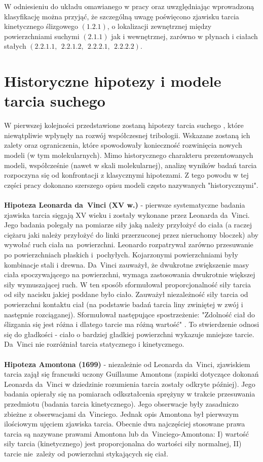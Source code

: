 \documentclass[12pt,a4paper,openright]{report} %
\begin{document}
W odniesieniu do układu omawianego w pracy oraz uwzględniając wprowadzoną klasyfikację można przyjąć, że szczególną uwagę poświęcono zjawisku tarcia kinetycznego ślizgowego $(1.2.1)$, o lokalizacji zewnętrznej między powierzchniami suchymi $(2.1.1)$ jak i wewnętrznej, zarówno w płynach i ciałach stałych $(2.2.1.1,~~ 2.2.1.2,~~ 2.2.2.1,~~ 2.2.2.2)$.
%
%
% 
\section{Historyczne hipotezy i modele tarcia suchego}
W pierwszej kolejności przedstawione zostaną hipotezy tarcia suchego \cite{Borys, Hebda, Janecki}, które niewątpliwie wpłynęły na rozwój współczesnej tribologii. Wskazane zostaną ich zalety oraz ograniczenia, które spowodowały konieczność rozwinięcia nowych modeli (w tym molekularnych). 
Mimo historycznego charakteru prezentowanych modeli, współcześnie (nawet w skali molekularnej), analizę wyników badań tarcia rozpoczyna się od konfrontacji z klasycznymi hipotezami. Z tego powodu w tej części pracy dokonano szerszego opisu modeli często nazywanych "historycznymi".  
%
\\
\\
\textbf{Hipoteza Leonarda da~Vinci (XV w.)} - pierwsze systematyczne badania zjawiska tarcia sięgają XV wieku i zostały wykonane przez Leonarda da~Vinci. Jego badania polegały na pomiarze siły jaką należy przyłożyć do ciała (a raczej ciężaru jaki należy przyłożyć do linki przerzuconej przez nieruchomy bloczek) aby wywołać ruch ciała na~powierzchni. Leonardo rozpatrywał zarówno przesuwanie po powierzchniach płaskich i~pochyłych. Kojarzonymi powierzchniami były kombinacje stali i drewna. Da~Vinci zauważył, że dwukrotne zwiększenie masy ciała spoczywającego na powierzchni, wymaga zastosowania dwukrotnie większej siły wymuszającej ruch. W ten sposób sformułował proporcjonalność siły tarcia od siły nacisku jakiej poddane było ciało. Zauważył niezależność siły tarcia od powierzchni kontaktu ciał (na podstawie badań tarcia liny zwiniętej w zwój i następnie rozciąganej). Sformułował następujące spostrzeżenie: "Zdolność ciał do ślizgania się jest różna i dlatego tarcie ma różną wartość" \cite{Borys}. To stwierdzenie odnosi się do gładkości - ciało o bardziej gładkiej powierzchni wykazuje mniejsze tarcie. Da~Vinci nie rozróżniał tarcia statycznego i kinetycznego.\\
\\
\textbf{Hipoteza Amontona (1699)} - niezależnie od Leonarda da~Vinci, zjawiskiem tarcia zajął się francuski uczony Guillaume Amontons (zapiski dotyczące dokonań Leonarda da~Vinci w dziedzinie rozumienia tarcia zostały odkryte później). Jego badania opierały się na pomiarach odkształcenia sprężyny w trakcie przesuwania przedmiotu (badania tarcia kinetycznego). Jego obserwacje były zasadniczo zbieżne z obserwacjami da~Vinciego. Jednak opis Amontona był pierwszym ilościowym ujęciem zjawiska tarcia. Obecnie dwa najczęściej stosowane prawa tarcia są nazywane prawami Amontona lub da~Vinciego-Amontona: I) wartość siły tarcia (kinetycznego) jest proporcjonalna do wartości siły normalnej, II) tarcie nie~zależy od powierzchni stykających się ciał.\\
\end{document}
